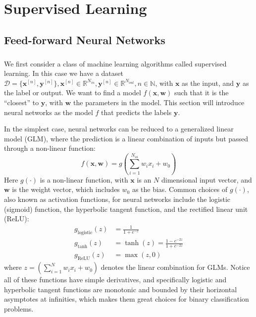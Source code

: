 
\chapter{Supervised Learning} \label{ch:supervised_learning}

\section{Feed-forward Neural Networks} \label{sc:nnet}

\paragraph{}
We first consider a class of machine learning algorithms
called supervised learning. 
In this case we have a dataset $\mathcal{D} = \{\mathbf{x}^{[n]}, 
\mathbf{y}^{[n]}\}, \mathbf{x}^{[n]} \in \mathbb{R}^{N_{in}}, 
\mathbf{y}^{[n]} \in \mathbb{R}^{N_{out}}, n \in \mathbb{N}$,
with $\mathbf{x}$ as the input, and $\mathbf{y}$ as the label or output.
We want to find a model 
$f(\mathbf{x},\mathbf{w})$ such that 
it is the ``closest'' to $\mathbf{y}$, 
with $\mathbf{w}$ the parameters in the model.
This section will introduce neural networks as the model $f$
that predicts the labels $\mathbf{y}$.

In the simplest case, neural networks can be reduced to 
a generalized linear model (GLM),
where the prediction is a linear combination of inputs
but passed through a non-linear function:
%
\begin{equation*}
	f(\mathbf{x},\mathbf{w}) = g\left( 
    \sum_{i=1}^{N_{in}} w_i x_i + w_0 \right)
\end{equation*}
%
\indent Here $g(\cdot)$ is a non-linear function, 
with $\mathbf{x}$ is an $N$ dimensional input vector,
and $\mathbf{w}$ is the weight vector,
which includes $w_0$ as the bias.
Common choices of $g(\cdot)$, also known as activation functions,
for neural networks 
include the logistic (sigmoid) function, the hyperbolic tangent function, 
and the rectified linear unit (ReLU):
%
\begin{equation*}
\begin{aligned}
	g_{\text{logistic}}(z) &= \frac{1}{1+e^{-z}} \\
	g_{\text{tanh}}(z) &= \tanh(z) = \frac{1 - e^{-2z}}{1 + e^{-2z}}\\
	g_\text{ReLU}(z) &= \max(z,0)
\end{aligned}
\end{equation*}
%
where $z = \left( \sum_{i=1}^N w_i x_i + w_0 \right)$ 
denotes the linear combination for GLMs.
Notice all of these functions have simple derivatives,
and specifically logistic and hyperbolic tangent functions 
are monotonic and bounded by their horizontal asymptotes at infinities,
which makes them great choices for binary classification problems.


